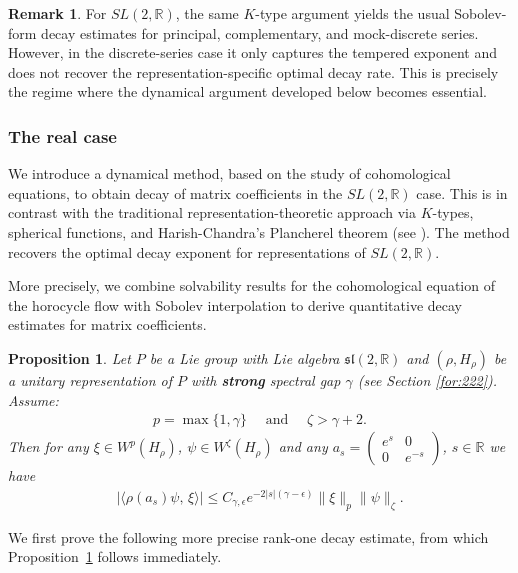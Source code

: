 \documentclass[11 pt]{amsart}
\newcommand{\RR}{\mathbb{R}}
\newtheorem{proposition}[theorem]{Proposition}
\theoremstyle{definition}
\newtheorem{remark}[theorem]{Remark}
\numberwithin{equation}{section}
\begin{document}
\begin{remark}
For \(SL(2,\RR)\), the same \(K\)-type argument yields the usual Sobolev-form
decay estimates for principal, complementary, and mock-discrete series. However,
in the discrete-series case it only captures the tempered exponent and does not
recover the representation-specific optimal decay rate. This is precisely the
regime where the dynamical argument developed below becomes essential.
\end{remark}


\subsubsection{The real case}\label{sec:7}
We introduce a dynamical method, based on the study of cohomological equations,
to obtain decay of matrix coefficients in the \(SL(2,\RR)\) case. This is in
contrast with the traditional representation-theoretic approach via \(K\)-types,
spherical functions, and Harish-Chandra's Plancherel theorem (see \cite{tan}). The method
recovers the optimal decay exponent for representations of \(SL(2,\RR)\).

More precisely, we combine solvability results for the cohomological equation of
the horocycle flow with Sobolev interpolation to derive quantitative decay
estimates for matrix coefficients.





\begin{proposition}\label{cor:4} Let $P$ be a Lie group with Lie algebra $\mathfrak{sl}(2,\RR)$ and $(\rho,H_\rho)$ be a unitary representation of $P$ with \textbf{strong} spectral gap $\gamma$ (see Section \ref{for:222}).  Assume:
 \begin{align*}
  p=\max\{1, \gamma\}\quad\text{ and }\quad\zeta>\gamma+2.
 \end{align*}
 Then for any $\xi\in W^{p}(H_\rho)$, $\psi\in W^{\zeta}(H_\rho)$ and
  any $a_s = \begin{pmatrix} e^{s} & 0 \\[5pt]
0 & e^{-s} \end{pmatrix}$, $s\in\RR$ we have
  \begin{align*}
\big|\langle \rho(a_s)\psi,\, \xi\rangle \big|\leq C_{\gamma,\epsilon}e^{-2|s|(\gamma-\epsilon)} \| \xi \|_{p} \big\|\psi\big\|_{\zeta}.
\end{align*}
\end{proposition}
We first prove the following more precise rank-one decay estimate, from which Proposition~\ref{cor:4} follows immediately.
\end{document}
